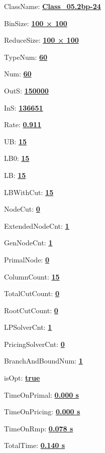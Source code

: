 \documentclass[11pt]{article}
\begin{document}
\pagestyle{empty}


ClassName: \underline{\textbf{Class_05.2bp-24}}
\par
BinSize: \underline{\textbf{100 × 100}}
\par
ReduceSize: \underline{\textbf{100 × 100}}
\par
TypeNum: \underline{\textbf{60}}
\par
Num: \underline{\textbf{60}}
\par
OutS: \underline{\textbf{150000}}
\par
InS: \underline{\textbf{136651}}
\par
Rate: \underline{\textbf{0.911}}
\par
UB: \underline{\textbf{15}}
\par
LB0: \underline{\textbf{15}}
\par
LB: \underline{\textbf{15}}
\par
LBWithCut: \underline{\textbf{15}}
\par
NodeCut: \underline{\textbf{0}}
\par
ExtendedNodeCnt: \underline{\textbf{1}}
\par
GenNodeCnt: \underline{\textbf{1}}
\par
PrimalNode: \underline{\textbf{0}}
\par
ColumnCount: \underline{\textbf{15}}
\par
TotalCutCount: \underline{\textbf{0}}
\par
RootCutCount: \underline{\textbf{0}}
\par
LPSolverCnt: \underline{\textbf{1}}
\par
PricingSolverCnt: \underline{\textbf{0}}
\par
BranchAndBoundNum: \underline{\textbf{1}}
\par
isOpt: \underline{\textbf{true}}
\par
TimeOnPrimal: \underline{\textbf{0.000 s}}
\par
TimeOnPricing: \underline{\textbf{0.000 s}}
\par
TimeOnRmp: \underline{\textbf{0.078 s}}
\par
TotalTime: \underline{\textbf{0.140 s}}
\par
\newpage


\end{document}
